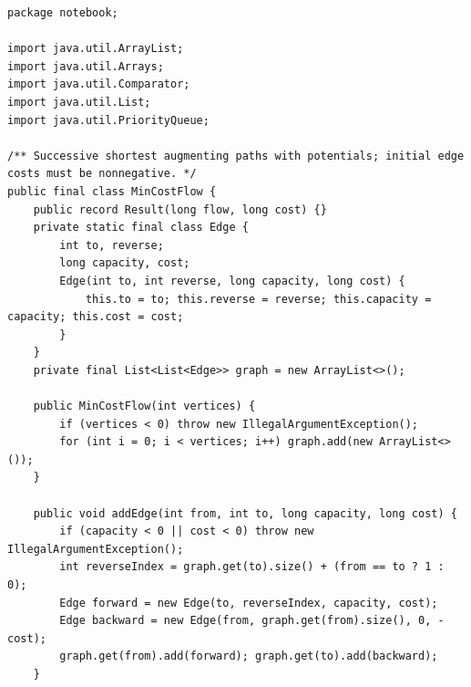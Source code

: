 \documentclass[10pt,letterpaper]{article}
\begin{document}
\begin{lstlisting}
package notebook;

import java.util.ArrayList;
import java.util.Arrays;
import java.util.Comparator;
import java.util.List;
import java.util.PriorityQueue;

/** Successive shortest augmenting paths with potentials; initial edge costs must be nonnegative. */
public final class MinCostFlow {
    public record Result(long flow, long cost) {}
    private static final class Edge {
        int to, reverse;
        long capacity, cost;
        Edge(int to, int reverse, long capacity, long cost) {
            this.to = to; this.reverse = reverse; this.capacity = capacity; this.cost = cost;
        }
    }
    private final List<List<Edge>> graph = new ArrayList<>();

    public MinCostFlow(int vertices) {
        if (vertices < 0) throw new IllegalArgumentException();
        for (int i = 0; i < vertices; i++) graph.add(new ArrayList<>());
    }

    public void addEdge(int from, int to, long capacity, long cost) {
        if (capacity < 0 || cost < 0) throw new IllegalArgumentException();
        int reverseIndex = graph.get(to).size() + (from == to ? 1 : 0);
        Edge forward = new Edge(to, reverseIndex, capacity, cost);
        Edge backward = new Edge(from, graph.get(from).size(), 0, -cost);
        graph.get(from).add(forward); graph.get(to).add(backward);
    }


\end{lstlisting}
\end{document}
